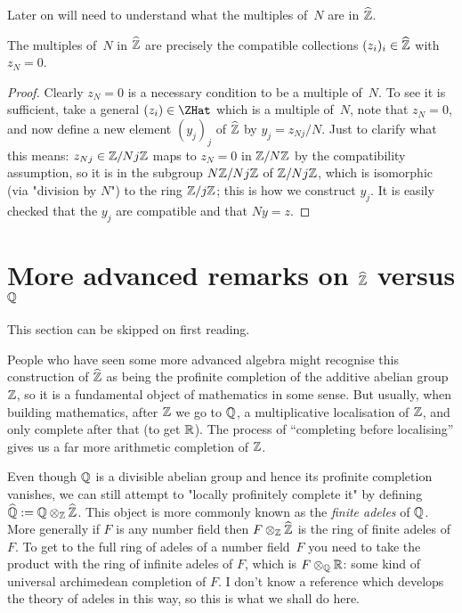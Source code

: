 Later on will need to understand what the multiples of~$N$ are in $\widehat{\mathbb{Z}}$.

\begin{lemma}
    \label{ZHat.multiples}
    The multiples of~$N$ in $\widehat{\mathbb{Z}}$ are precisely the compatible collections $(z_i)_i\in\widehat{\mathbb{Z}}$ 
    with $z_N=0$.
\end{lemma}
\begin{proof}
    Clearly $z_N=0$ is a necessary condition to be a multiple of~$N$. To see it is sufficient, 
    take a general $(z_i)\in\ZHat$ which is a multiple of~$N$, note that $z_N=0$, 
    and now define a new element $(y_j)_j$ of $\widehat{\mathbb{Z}}$
    by $y_j=z_{Nj}/N$. Just to clarify what this means: $z_{Nj}\in\mathbb{Z}/Nj\mathbb{Z}$ maps to $z_N=0$ in $\mathbb{Z}/N\mathbb{Z}$
    by the compatibility assumption, so it is in the subgroup $N\mathbb{Z}/Nj\mathbb{Z}$ of $\mathbb{Z}/Nj\mathbb{Z}$, 
    which is isomorphic (via "division by $N$") to the ring $\mathbb{Z}/j\mathbb{Z}$; this is how we construct 
    $y_j$. It is easily checked that the $y_j$ are compatible and that $Ny=z$.
\end{proof}

\section{More advanced remarks on $\widehat{\mathbb{Z}}$ versus $\mathbb{Q}$}

This section can be skipped on first reading.

People who have seen some more advanced algebra might recognise this construction of $\widehat{\mathbb{Z}}$
as being the profinite completion of the additive abelian group $\mathbb{Z}$, so it is a fundamental
object of mathematics in some sense. But usually, when building mathematics, after $\mathbb{Z}$ we 
go to $\mathbb{Q}$, a multiplicative localisation of $\mathbb{Z}$, and only complete after that (to get $\mathbb{R}$).
The process of ``completing before localising'' gives us a far more arithmetic completion
of $\mathbb{Z}$.

Even though $\mathbb{Q}$ is a divisible abelian group and hence its profinite completion vanishes,
we can still attempt to "locally profinitely complete it" by defining $\widehat{\mathbb{Q}}:=\mathbb{Q}\otimes_{\mathbb{Z}}\widehat{\mathbb{Z}}$. 
This object is more commonly known as the \emph{finite adeles} of $\mathbb{Q}$. More generally if $F$ is
any number field then $F\otimes_{\mathbb{Z}}\widehat{\mathbb{Z}}$ is the ring of finite adeles of $F$. To get to
the full ring of adeles of a number field~$F$ you need to take the product with the
ring of infinite adeles of $F$, which is $F\otimes_{\mathbb{Q}}\mathbb{R}$: some kind of universal
archimedean completion of $F$. I don't know a reference which develops the theory of adeles
in this way, so this is what we shall do here.

